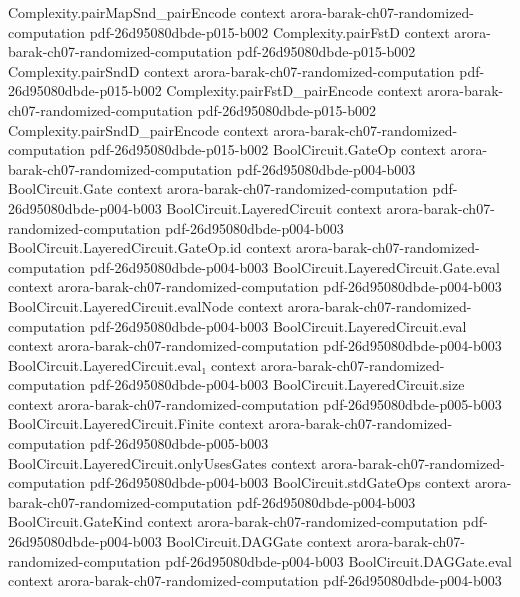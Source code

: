 \begin{theorem}
\proofstep
  {Complexity.pairMapSnd_pairEncode}
  {context}
  {arora-barak-ch07-randomized-computation}
  {pdf-26d95080dbde-p015-b002}
\proofstep
  {Complexity.pairFstD}
  {context}
  {arora-barak-ch07-randomized-computation}
  {pdf-26d95080dbde-p015-b002}
\proofstep
  {Complexity.pairSndD}
  {context}
  {arora-barak-ch07-randomized-computation}
  {pdf-26d95080dbde-p015-b002}
\proofstep
  {Complexity.pairFstD_pairEncode}
  {context}
  {arora-barak-ch07-randomized-computation}
  {pdf-26d95080dbde-p015-b002}
\proofstep
  {Complexity.pairSndD_pairEncode}
  {context}
  {arora-barak-ch07-randomized-computation}
  {pdf-26d95080dbde-p015-b002}
\proofstep
  {BoolCircuit.GateOp}
  {context}
  {arora-barak-ch07-randomized-computation}
  {pdf-26d95080dbde-p004-b003}
\proofstep
  {BoolCircuit.Gate}
  {context}
  {arora-barak-ch07-randomized-computation}
  {pdf-26d95080dbde-p004-b003}
\proofstep
  {BoolCircuit.LayeredCircuit}
  {context}
  {arora-barak-ch07-randomized-computation}
  {pdf-26d95080dbde-p004-b003}
\proofstep
  {BoolCircuit.LayeredCircuit.GateOp.id}
  {context}
  {arora-barak-ch07-randomized-computation}
  {pdf-26d95080dbde-p004-b003}
\proofstep
  {BoolCircuit.LayeredCircuit.Gate.eval}
  {context}
  {arora-barak-ch07-randomized-computation}
  {pdf-26d95080dbde-p004-b003}
\proofstep
  {BoolCircuit.LayeredCircuit.evalNode}
  {context}
  {arora-barak-ch07-randomized-computation}
  {pdf-26d95080dbde-p004-b003}
\proofstep
  {BoolCircuit.LayeredCircuit.eval}
  {context}
  {arora-barak-ch07-randomized-computation}
  {pdf-26d95080dbde-p004-b003}
\proofstep
  {BoolCircuit.LayeredCircuit.eval₁}
  {context}
  {arora-barak-ch07-randomized-computation}
  {pdf-26d95080dbde-p004-b003}
\proofstep
  {BoolCircuit.LayeredCircuit.size}
  {context}
  {arora-barak-ch07-randomized-computation}
  {pdf-26d95080dbde-p005-b003}
\proofstep
  {BoolCircuit.LayeredCircuit.Finite}
  {context}
  {arora-barak-ch07-randomized-computation}
  {pdf-26d95080dbde-p005-b003}
\proofstep
  {BoolCircuit.LayeredCircuit.onlyUsesGates}
  {context}
  {arora-barak-ch07-randomized-computation}
  {pdf-26d95080dbde-p004-b003}
\proofstep
  {BoolCircuit.stdGateOps}
  {context}
  {arora-barak-ch07-randomized-computation}
  {pdf-26d95080dbde-p004-b003}
\proofstep
  {BoolCircuit.GateKind}
  {context}
  {arora-barak-ch07-randomized-computation}
  {pdf-26d95080dbde-p004-b003}
\proofstep
  {BoolCircuit.DAGGate}
  {context}
  {arora-barak-ch07-randomized-computation}
  {pdf-26d95080dbde-p004-b003}
\proofstep
  {BoolCircuit.DAGGate.eval}
  {context}
  {arora-barak-ch07-randomized-computation}
  {pdf-26d95080dbde-p004-b003}

\end{theorem}
